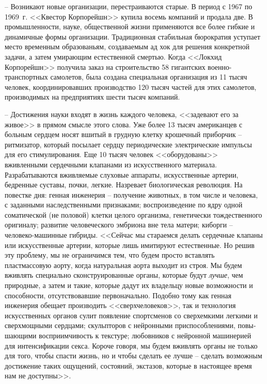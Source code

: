 \documentclass{book}
\begin{document}
-- Возникают новые организации, перестраиваются старые. В период с 1967 по 1969~г. <<Квестор Корпорейшн>> купила восемь компаний и продала две. В промышленности, науке, общественной жизни применяются все более гибкие и динамичные формы организации. Традиционная стабильная бюрократия уступает место временным образованьям, создаваемым ад хок для решения конкретной задачи, а затем умирающим естественной смертью. Когда <<Локхид Корпорейшн>> получила заказ на строительство 58 гигантских военно-транспортных самолетов, была создана специальная организация из 11 тысяч человек, координировавших производство 120 тысяч частей для этих самолетов, производимых на предприятиях шести тысяч компаний.

-- Достижения науки входят в жизнь каждого человека, <<задевают его за живое>> в прямом смысле этого слова. Уже бо­лее 13 тысяч американцев с больным сердцем носят вшитый в грудную клетку крошечный приборчик -- ритмизатор, который посылает сердцу периодические электрические импульсы для его стимулирования. Еще 10 тысяч человек <<оборудованы>> вживленными сердечными клапанами из искусственного материала. Разрабатываются вживляемые слуховые аппараты, искусственные артерии, бедренные суставы, почки, легкие. Назревает биологическая революция. На повестке дня: генная инже­нерия -- получение животных, в том числе и человека, с заданными наследственными признаками; воспроизведение по ядру одной соматической (не половой) клетки целого организма, генетически тождественного оригиналу; развитие человеческого эмбриона вне тела матери; киборги -- человеко-машинные гибриды. <<Сейчас мы стараемся делать сердечные клапаны или искусственные артерии, которые лишь имитируют естественные. Но решив эту проблему, мы не 
ограничимся тем, что будем просто вставлять пластмассовую аорту, когда натуральная аорта выходит из строя. Мы будем вживлять специально сконструированные органы, которые будут \textit{лучше},  чем природные, а затем и такие, которые дадут их владельцу новые возможности и способности, отсутствовавшие первоначально. Подобно тому как генная инженерия обещает производить <<сверхчеловеков>>, так и технология искусственных органов сулит появление спортсменов со сверхемкими легкими и сверхмощными серд­цами; скульпторов с нейронными приспособлениями, повы­шающими восприимчивость к текстуре; любовников с ней­ронной машинерией для интенсификации секса. Короче говоря, мы будем вживлять органы не только для того, чтобы спасти жизнь, но и чтобы сделать ее лучше -- сделать возможным дости­жение таких ощущений, состояний, экстазов, которые в насто­ящее время нам не доступны>>.%
\end{document}
